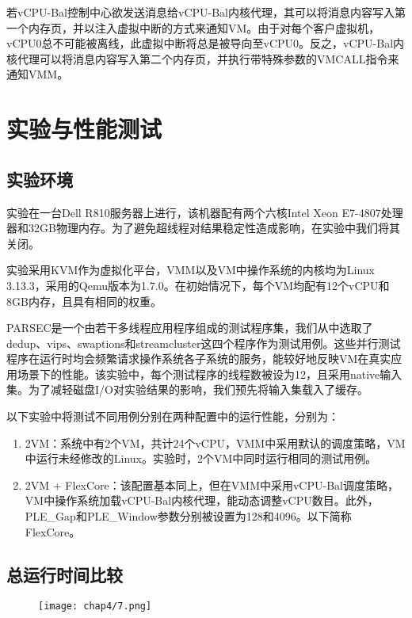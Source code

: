 若vCPU-Bal控制中心欲发送消息给vCPU-Bal内核代理，其可以将消息内容写入第一个内存页，并以注入虚拟中断的方式来通知VM。由于对每个客户虚拟机，vCPU0总不可能被离线，此虚拟中断将总是被导向至vCPU0。反之，vCPU-Bal内核代理可以将消息内容写入第二个内存页，并执行带特殊参数的VMCALL指令来通知VMM。



\section{实验与性能测试}

\subsection{实验环境}

实验在一台Dell R810服务器上进行，该机器配有两个六核Intel Xeon E7-4807处理器和32GB物理内存。为了避免超线程对结果稳定性造成影响，在实验中我们将其关闭。

实验采用KVM\cite{kivity2007kvm}作为虚拟化平台，VMM以及VM中操作系统的内核均为Linux 3.13.3，采用的Qemu版本为1.7.0。在初始情况下，每个VM均配有12个vCPU和8GB内存，且具有相同的权重。

PARSEC\cite{bienia2008parsec}是一个由若干多线程应用程序组成的测试程序集，我们从中选取了dedup、vips、swaptions和streamcluster这四个程序作为测试用例。这些并行测试程序在运行时均会频繁请求操作系统各子系统的服务，能较好地反映VM在真实应用场景下的性能。该实验中，每个测试程序的线程数被设为12，且采用native输入集。为了减轻磁盘I/O对实验结果的影响，我们预先将输入集载入了缓存。

以下实验中将测试不同用例分别在两种配置中的运行性能，分别为：

\begin{enumerate}
\item 2VM：系统中有2个VM，共计24个vCPU，VMM中采用默认的调度策略，VM中运行未经修改的Linux。实验时，2个VM中同时运行相同的测试用例。
\item 2VM + FlexCore：该配置基本同上，但在VMM中采用vCPU-Bal调度策略，VM中操作系统加载vCPU-Bal内核代理，能动态调整vCPU数目。此外，PLE\_Gap和PLE\_Window参数分别被设置为128和4096。以下简称FlexCore。
\end{enumerate}


\subsection{总运行时间比较}

\begin{figure}[!htbp]
  \centering
  \texttt{[image: chap4/7.png]}
\end{figure}

